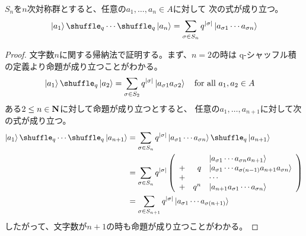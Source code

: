 {	\begin{proposition}[q-シャッフル写像その一]
	\label{prop:q-シャッフル写像その一} %
		$S_n$を$n$次対称群とすると、任意の$a_1,\dots,a_n\in A$に対して
		次の式が成り立つ。
		\begin{equation*}\begin{split}
			\ket{a_1}\shuffle_q\cdots\shuffle_q\ket{a_n}
			= \sum_{\sigma\in S_n} q^{|\sigma|}
			\ket{a_{\sigma1}\cdots a_{\sigma n}}
		\end{split}\end{equation*}
	\end{proposition} %
	\begin{proof} 文字数$n$に関する帰納法で証明する。まず、$n=2$の時は
	q-シャッフル積の定義より命題が成り立つことがわかる。
	\begin{equation*}\begin{split}
		\ket{a_1}\shuffle_q\ket{a_2}
		&= \sum_{\sigma\in S_2} q^{|\sigma|} \ket{a_{\sigma1}a_{\sigma2}}
		\quad\text{for all } a_1,a_2\in A
	\end{split}\end{equation*}
	ある$2\le n\in\mathbf{N}$に対して命題が成り立つとすると、
	任意の$a_1,\dots,a_{n+1}$に対して次の式が成り立つ。
	\begin{equation*}\begin{split}
		\ket{a_1}\shuffle_q\cdots\shuffle_q\ket{a_{n+1}}
		&= \sum_{\sigma\in S_n} q^{|\sigma|} \ket{a_{\sigma1}\cdots a_{\sigma n}}
			\shuffle_q\ket{a_{n+1}} \\
		&= \sum_{\sigma\in S_n} q^{|\sigma|} \left(\begin{array}{rrl}
			&& \ket{a_{\sigma1}\cdots a_{\sigma n}a_{n+1}} \\
			+& q & \ket{a_{\sigma1}\cdots a_{\sigma(n-1)}a_{n+1}a_{\sigma n}} \\
			+& & \cdots \\
			+& q^n & \ket{a_{n+1}a_{\sigma1}\cdots a_{\sigma n}} \\
		\end{array}\right) \\
		&= \sum_{\sigma\in S_{n+1}} q^{|\sigma|} \ket{a_{\sigma1}
			\cdots a_{\sigma(n+1)}} \\
	\end{split}\end{equation*}
	したがって、文字数が$n+1$の時も命題が成り立つことがわかる。
	\end{proof}

}
